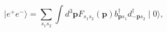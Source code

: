 \begin{equation}
\mid e^{+}e^{-}\rangle =\underset{s_{1}s_{2}}{\sum }\int d^{3}\mathbf{p}%
F_{s_{1}s_{2}}(\mathbf{p})b_{\mathbf{p}s_{1}}^{\dagger }d_{-\mathbf{p}%
s_{2}}^{\dagger }\mid 0\rangle ,
\end{equation}

